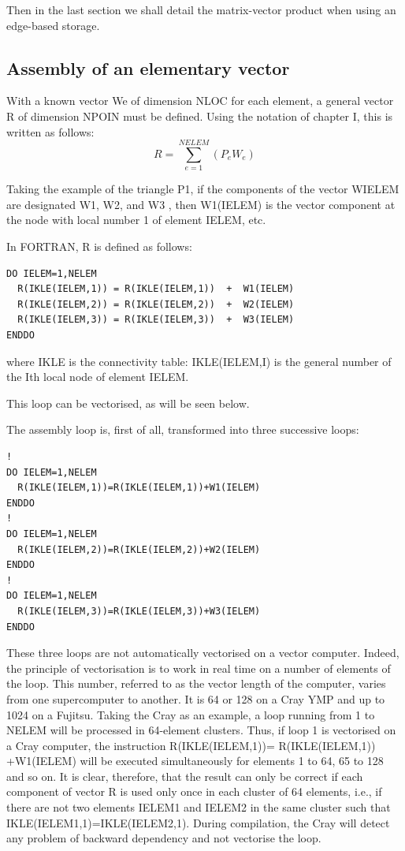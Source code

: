 Then in the last section we shall detail the matrix-vector product when using
an edge-based storage.

\subsection{Assembly of an elementary vector}

With a known vector We of dimension NLOC for each element, a general vector R
of dimension NPOIN must be defined. Using the notation of chapter I, this is
written as follows:
\[R=\sum _{e=1}^{NELEM}(P_{e} W_{e} ) \]

Taking the example of the triangle P1, if the components of the vector WIELEM
are designated W1, W2, and W3 , then W1(IELEM) is the vector component at the
node with local number 1 of element IELEM, etc.

In FORTRAN, R is defined as follows:

\begin{lstlisting}[language=TelFortran]
DO IELEM=1,NELEM
  R(IKLE(IELEM,1)) = R(IKLE(IELEM,1))  +  W1(IELEM)
  R(IKLE(IELEM,2)) = R(IKLE(IELEM,2))  +  W2(IELEM)
  R(IKLE(IELEM,3)) = R(IKLE(IELEM,3))  +  W3(IELEM)
ENDDO
\end{lstlisting}

where IKLE is the connectivity table: IKLE(IELEM,I) is the general number of
the Ith local node of element IELEM.

This loop can be vectorised, as will be seen below.

The assembly loop is, first of all, transformed into three successive loops:

\begin{lstlisting}[language=TelFortran]
!
DO IELEM=1,NELEM
  R(IKLE(IELEM,1))=R(IKLE(IELEM,1))+W1(IELEM)
ENDDO
!
DO IELEM=1,NELEM
  R(IKLE(IELEM,2))=R(IKLE(IELEM,2))+W2(IELEM)
ENDDO
!
DO IELEM=1,NELEM
  R(IKLE(IELEM,3))=R(IKLE(IELEM,3))+W3(IELEM)
ENDDO
\end{lstlisting}

These three loops are not automatically vectorised on a vector computer.
Indeed, the principle of vectorisation is to work in real time on a number of
elements of the loop. This number, referred to as the vector length of the
computer, varies from one supercomputer to another. It is 64 or 128 on a Cray
YMP and up to 1024 on a Fujitsu. Taking the Cray as an example, a loop running
from 1 to NELEM will be processed in 64-element clusters. Thus, if loop 1 is
vectorised on a Cray computer, the instruction R(IKLE(IELEM,1))=
R(IKLE(IELEM,1)) +W1(IELEM) will be executed simultaneously for elements 1 to
64, 65 to 128 and so on. It is clear, therefore, that the result can only be
correct if each component of vector R is used only once in each cluster of 64
elements, i.e., if there are not two elements IELEM1 and IELEM2 in the same
cluster such that IKLE(IELEM1,1)=IKLE(IELEM2,1). During compilation, the Cray
will detect any problem of backward dependency and not vectorise the loop.

